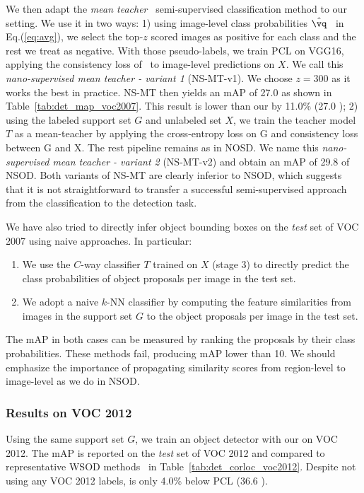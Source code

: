 We then adapt the \emph{mean teacher}~\cite{TV17} semi-supervised classification method to our setting. We use it in two ways: 1) using image-level class probabilities $\hat \vq$~ in Eq.(\ref{eq:avg}), we select the top-$z$ scored images as positive for each class and the rest we treat as negative.
With those pseudo-labels, we train PCL on VGG16, applying the consistency loss of~\cite{TV17} to image-level predictions on $X$. We call this \emph{nano-supervised mean teacher - variant 1} (NS-MT-v1).
We choose $z = 300$ as it works the best in practice. NS-MT then yields an mAP of 27.0 as shown in Table~\ref{tab:det_map_voc2007}. This result is lower than our \ours by {11.0\%} ({27.0} ); 2) using the labeled support set $G$ and unlabeled set $X$, we train the teacher model $T$ as a mean-teacher by applying the cross-entropy loss on G and consistency loss between G and X. The rest pipeline remains as in NOSD. We name this \emph{nano-supervised mean teacher - variant 2} (NS-MT-v2) and obtain an mAP of 29.8  of NSOD. Both variants of NS-MT are clearly inferior to NSOD, which suggests that it is not straightforward to transfer a successful semi-supervised approach from the classification to the detection task.

We have also tried to directly infer object bounding
boxes on the \emph{test} set of VOC 2007 using naive approaches.
In particular:
\begin{enumerate}
	\item We use the $C$-way classifier $T$ trained on $X$ (stage 3) to directly predict the class probabilities of object proposals per image in the test set.
	\item We adopt a naive $k$-NN classifier by computing the feature similarities from images in the support set $G$ to the object proposals per image in the test set.
\end{enumerate}
The mAP in both cases can be measured by ranking the proposals by their class probabilities. These methods fail, producing mAP lower than 10. We should emphasize the importance
of propagating similarity scores from region-level to image-level as we do in NSOD.


\subsubsection{Results on VOC 2012}
Using the same support set $G$, we train an object detector with our \ours on VOC 2012. The mAP is reported on the \emph{test} set of VOC 2012 and compared to representative WSOD methods~\cite{tang2017cvpr,tang2018pami,zhang2018cvpr} in Table~\ref{tab:det_corloc_voc2012}.
Despite not using any VOC 2012 labels, \ours is only 4.0\% below PCL (36.6 ).


